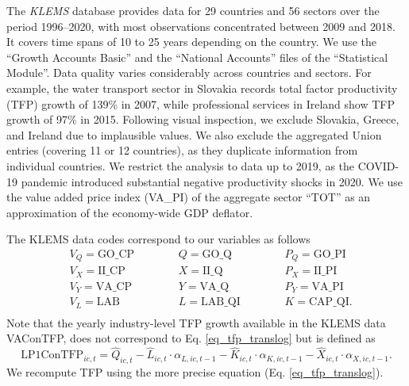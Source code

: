 \documentclass[11pt]{article}
\begin{document}
The \textit{KLEMS} database provides data for 29 countries and 56 sectors over the period 1996–2020, with most observations concentrated between 2009 and 2018. It covers time spans of 10 to 25 years depending on the country. We use the ``Growth Accounts Basic'' and the ``National Accounts'' files of the ``Statistical Module''. 
Data quality varies considerably across countries and sectors. For example, the water transport sector in Slovakia records total factor productivity (TFP) growth of 139\% in 2007, while professional services in Ireland show TFP growth of 97\% in 2015. Following visual inspection, we exclude Slovakia, Greece, and Ireland due to implausible values. We also exclude the aggregated Union entries (covering 11 or 12 countries), as they duplicate information from individual countries. We restrict the analysis to data up to 2019, as the COVID-19 pandemic introduced substantial negative productivity shocks in 2020.
We use the value added price index (VA\_PI) of the aggregate sector “TOT” as an approximation of the economy-wide GDP deflator.

The KLEMS data codes correspond to our variables as follows
\begin{align*}
&V_Q = \text{GO\_CP} \hspace{1cm}& 
&Q = \text{GO\_Q} \hspace{1cm}& 
&P_Q = \text{GO\_PI} \\
&V_X = \text{II\_CP} \hspace{1cm}& 
&X = \text{II\_Q} \hspace{1cm}& 
&P_X = \text{II\_PI} \\
&V_Y = \text{VA\_CP} \hspace{1cm}& 
&Y = \text{VA\_Q} \hspace{1cm}& 
&P_Y = \text{VA\_PI} \\
&V_L = \text{LAB} \hspace{1cm}& 
&L = \text{LAB\_QI} \hspace{1cm}& 
&K = \text{CAP\_QI}. \\
\end{align*}
Note that the yearly industry-level TFP growth available in the KLEMS data VAConTFP, does not correspond to Eq. \eqref{eq_tfp_translog} but is defined as 
\[
\text{LP1ConTFP}_{ic,t} =
     \hat{Q}_{ic,t} -
     \hat{L}_{ic,t} \cdot \alpha_{L,ic,t-1} -
    \hat{K}_{ic,t} \cdot \alpha_{K,ic,t-1}-
     \hat{X}_{ic,t} \cdot \alpha_{X,ic,t-1}.
\]
We recompute TFP using the more precise equation (Eq. \eqref{eq_tfp_translog}).

\end{document}
